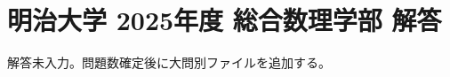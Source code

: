 \documentclass[../../uem_mei_a.tex]{subfiles}
\begin{document}
    \section{明治大学 2025年度 総合数理学部 解答}

    解答未入力。問題数確定後に大問別ファイルを追加する。
\end{document}
